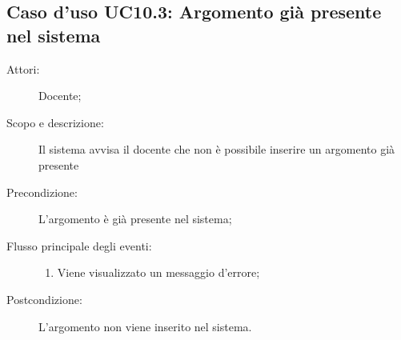 \subsection{Caso d'uso UC10.3: Argomento già presente nel sistema}\begin{description}
\item[Attori:] Docente;
\item[Scopo e descrizione:] Il sistema avvisa il docente che non è possibile inserire un argomento già presente
      \item[Precondizione:] L'argomento è già presente nel sistema;

        \item[Flusso principale degli eventi:] \begin{enumerate}
          \item Viene visualizzato un messaggio d'errore;

      \end{enumerate}
    \item[Postcondizione:] L'argomento non viene inserito nel sistema.
  \end{description}
\hypertarget{UC10.4}{}
